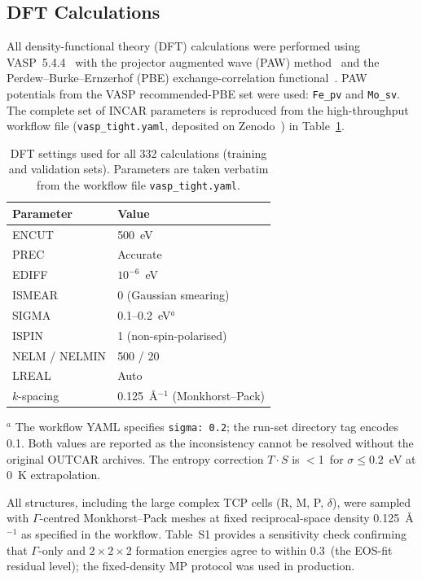 
\subsection{DFT Calculations}

All density-functional theory (DFT) calculations were performed using VASP~5.4.4~\cite{vasp_a,vasp_b} with the projector augmented wave (PAW) method~\cite{paw_blochl,paw_kj} and the Perdew--Burke--Ernzerhof (PBE) exchange-correlation functional~\cite{pbe}. PAW potentials from the VASP recommended-PBE set were used: \texttt{Fe\_pv} and \texttt{Mo\_sv}. The complete set of INCAR parameters is reproduced from the high-throughput workflow file (\texttt{vasp\_tight.yaml}, deposited on Zenodo~\cite{zenodo}) in Table~\ref{tab:dft_settings}.

\begin{table}[htbp]
  \centering
  \caption{DFT settings used for all 332 calculations (training and validation sets). Parameters are taken verbatim from the workflow file \texttt{vasp\_tight.yaml}.}
  \label{tab:dft_settings}
  \begin{tabular}{ll}
    \toprule
    Parameter & Value \\
    \midrule
    ENCUT  & 500~eV \\
    PREC   & Accurate \\
    EDIFF  & $10^{-6}$~eV \\
    ISMEAR & 0 (Gaussian smearing) \\
    SIGMA  & 0.1--0.2~eV$^{a}$ \\
    ISPIN  & 1 (non-spin-polarised) \\
    NELM / NELMIN & 500 / 20 \\
    LREAL  & Auto \\
    $k$-spacing & 0.125~\AA$^{-1}$ (Monkhorst--Pack) \\
    \bottomrule
  \end{tabular}
  \begin{flushleft}
    \small $^{a}$ The workflow YAML specifies \texttt{sigma: 0.2}; the run-set directory tag encodes 0.1. Both values are reported as the inconsistency cannot be resolved without the original OUTCAR archives. The entropy correction $T \cdot S$ is $<$1~\meVat for $\sigma \leq 0.2$~eV at 0~K extrapolation.
  \end{flushleft}
\end{table}

All structures, including the large complex TCP cells (R, M, P, $\delta$), were sampled with $\Gamma$-centred Monkhorst--Pack meshes at fixed reciprocal-space density 0.125~\AA$^{-1}$ as specified in the workflow. Table~S1 provides a sensitivity check confirming that $\Gamma$-only and $2\times2\times2$ formation energies agree to within 0.3~\meVat (the EOS-fit residual level); the fixed-density MP protocol was used in production.

